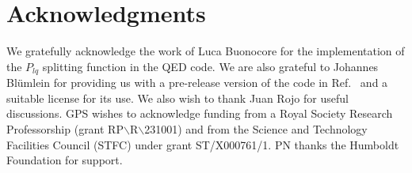 \documentclass[preprint,1p,a4paper,11pt]{elsarticle}
\begin{document}
\section*{Acknowledgments}

We gratefully acknowledge the work of Luca Buonocore
for the implementation of the $P_{lq}$ splitting function in the QED code.
%
We are also grateful to Johannes Bl\"umlein for providing us with a
pre-release version of the code in Ref.~\cite{BlumleinCode} and a
suitable license for its use.
%
We also wish to thank Juan Rojo for useful discussions. 
%
GPS wishes to acknowledge funding from a Royal Society Research
Professorship (grant RP$\backslash$R$\backslash$231001) and from the Science and
Technology Facilities Council (STFC) under grant ST/X000761/1.
%
PN thanks the Humboldt Foundation for support. 
%



%
\end{document}
